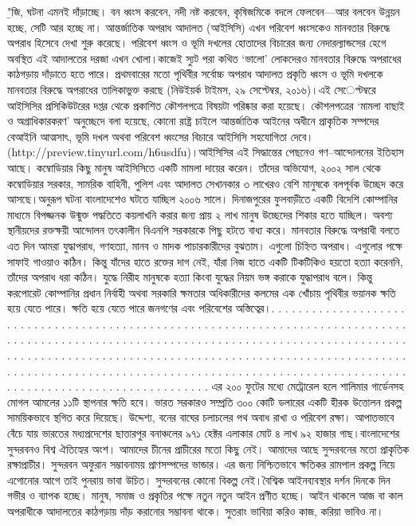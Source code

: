 \documentclass[a4paper,12pt]{report}
\begin{document}
	{\b "জি, ঘটনা এমনই দাঁড়াচ্ছে। বন ধ্বংস করবেন, নদী নষ্ট করবেন, কৃষিজমিকে বদলে ফেলবেন—আর বলবেন উন্নয়ন হচ্ছে, সেটি আর হচ্ছে না। আন্তর্জাতিক অপরাধ আদালত (আইসিসি) এখন পরিবেশ ধ্বংসকেও মানবতার বিরুদ্ধে অপরাধ হিসেবে দেখা শুরু করেছে। পরিবেশ ধ্বংস ও ভূমি দখলের হোতাদের বিচারের জন্য নেদারল্যান্ডসের হেগে অবস্থিত এই আদালতের দরজা এখন খোলা।কাজেই স্যুট পরা কথিত ‘ভালো’ লোকদেরও মানবতার বিরুদ্ধে অপরাধের কাঠগড়ায় দাঁড়াতে হতে পারে। প্রথমবারের মতো পৃথিবীর সর্বোচ্চ অপরাধ আদালত প্রকৃতি ধ্বংস ও ভূমি দখলকে মানবতার বিরুদ্ধে অপরাধের তালিকাভুক্ত করছে (নিউইয়র্ক টাইমস, ২৯ সেপ্টেম্বর, ২০১৬)।এ​ই সে​েপ্টম্বরে আইসিসির প্রসিকিউটরের দপ্তর থেকে প্রকাশিত কৌশলপত্রে বিষয়টা পরিষ্কার করা হয়েছে। কৌশলপত্রের ‘মামলা বাছাই ও অগ্রাধিকারকরণ’ অনুচ্ছেদে বলা হয়েছে, কোনো রাষ্ট্র চাইলে আন্তর্জাতিক আইনের অধীনে প্রাকৃতিক সম্পদের বেআইনি আত্মসাৎ, ভূমি দখল অথবা পরিবেশ ধ্বংসের বিচারে আইসিসি সহযোগিতা দেবে। (http://preview.tinyurl.com/h6usdfu)।আইসিসির এই সিদ্ধান্তের পেছনেও গণ–আন্দোলনের ইতিহাস আছে। কম্বোডিয়ার কিছু মানুষ আইসিসিতে একটি মামলা দায়ের করেন। তাঁদের অভিযোগ, ২০০২ সাল থেকে কম্বোডিয়ার সরকার, সামরিক বাহিনী, পুলিশ এবং আদালত সেখানকার ৩ লাখেরও বেশি মানুষকে বলপূর্বক উচ্ছেদ করে আসছে।অনুরূপ ঘটনা বাংলাদেশেও ঘটতে যাচ্ছিল ২০০৬ সালে। দিনাজপুরের ফুলবাড়ীতে একটি বিদেশি কোম্পানির মাধ্যমে বিপজ্জনক উন্মুক্ত পদ্ধতিতে কয়লাখনি করার জন্য প্রায় ২ লাখ মানুষ উচ্ছেদের শিকার হতে যাচ্ছিল। অবশ্য স্থানীয়দের রক্তক্ষয়ী আন্দোলন তৎকালীন বিএনপি সরকারকে পিছু হটতে বাধ্য করে। মানবতার বিরুদ্ধে অপরাধী বলতে এত দিন আমরা যুদ্ধাপরাধ, গণহত্যা, মানব ও মাদক পাচারকারীদের বুঝতাম। এগুলো চিহ্নিত অপরাধ। এগুলোর পক্ষে সাফাই গাওয়াও কঠিন। কিন্তু যাঁদের হাতে রক্তের দাগ নেই, যাঁরা নিজ হাতে একটি টিকটিকিও হয়তো হত্যা করেননি, তাঁদের অপরাধ ধরা কঠিন। যুদ্ধে নিরীহ মানুষকে হত্যা কিংবা যুদ্ধের নিয়ম ভঙ্গ করাকে যুদ্ধাপরাধ বলে। কিন্তু করপোরেট কোম্পানির প্রধান নির্বাহী অথবা সরকারি ক্ষমতার অধিকারীদের কলমের এক খোঁচায় পৃথিবীর ভয়ানক ক্ষতি হয়ে যেতে পারে। ক্ষতি হয়ে যেতে পারে জনগণের এবং পরিবেশের অস্তিত্বের।. . . . . . . . . . . . . . . . . . . . . . . . . . . . . . . . . . . . . . . . . . . . . . . . . . . . . . . . . . . . . . . . . . . . . . . . . . . . . . . . . . . . . . . . . . . . . . . . . . . . . . . . . . . . . . . . . . . . . . . . . . . . . . . . . . . . . . . . . . . . . . . . . . . . . . . . . . . . . . . . . . . . . . . . . . . . . . . . . . . . . . . . . . . . . . . . . . . . . . . . . . . . . . . . . . . . . . . . . . . . . . . . . . . . . . . . . . . . . . . . . . . . . . . . . . . . . . . . . . . . . . . . . . . . . . . . . . . . . . . . . . . . . . 
এর ২০০ ফুটের মধ্যে মেট্রোরেল হলে শালিমার গার্ডেনসহ মোগল আমলের ১১টি স্থাপনার ক্ষতি হবে। ভারত সরকারও সম্প্রতি ৩০০ কোটি ডলারের একটি হীরক উত্তোলন প্রকল্প সাময়িকভাবে স্থগিত করে দিয়েছে। উদ্দেশ্য, বনের বাঘের চলাচলের পথ অবাধ রাখা ও পরিবেশ রক্ষা। আপাতভাবে বেঁচে যায় ভারতের মধ্যপ্রদেশের ছাত্তারপুর বনাঞ্চলের ৯৭১ হেক্টর এলাকার মোট ৪ লাখ ৯২ হাজার গাছ।বাংলাদেশের সুন্দরবনও বিশ্ব ঐতিহ্যের অংশ। আমাদের চীনের প্রাচীরের মতো কিছু নেই। আমাদের আছে সুন্দরবনের মতো প্রাকৃতিক রক্ষাপ্রাচীর। সুন্দরবন অফুরান সম্ভাবনাময় প্রাণসম্পদের ভান্ডার। এর জন্য নিশ্চিতভাবে ক্ষতিকর রামপাল প্রকল্প নিয়ে এগোনোর  আগে তাই পুনরায় ভাবা উচিত। সুন্দরবনের কোনো বিকল্প নেই।বৈশ্বিক আইনব্যবস্থার দর্শন দিনকে দিন গভীর ও ব্যাপক হচ্ছে। মানুষ, সমাজ ও প্রকৃতির পক্ষে নতুন নতুন আইন প্রণীত হচ্ছে। আইন থাকলে আজ বা কাল অপরাধীকে আদালতের কাঠগড়ায় দাঁড় করানোর সম্ভাবনা থাকে। সুতরাং ভাবিয়া করিও কাজ, করিয়া ভাবিও না।}
\end{document}
